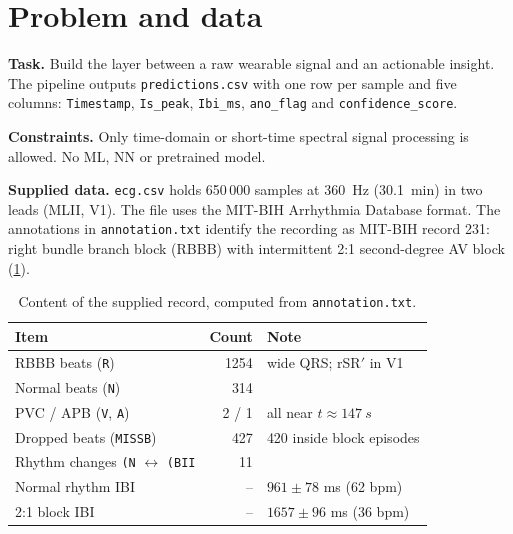 \documentclass[10pt,a4paper]{article}
\newcommand{\code}[1]{\texttt{#1}}
\begin{document}
\begin{abstract}
\textbf{Results.}
\begin{itemize}
  \item Supplied record (MIT-BIH 231, intermittent 2:1 AV block): beat $F_1=1.000$, IBI mean absolute error
        \SI{0.99}{ms}, sample-level anomaly $F_1=0.992$.
  \item 44 stress sets (real NSTDB noise, seven real AF/VT records, synthetic motion-corrupted PPG): mean beat
        $F_1=0.925$, mean anomaly $F_1=0.878$. The two design branches alone scored 0.925 / 0.860 and 0.892 / 0.774.
  \item Independent PPG fixture with accelerometer, jittered timestamps and gaps: beat $F_1=0.996$, anomaly $F_1=0.865$.
  \item Runtime: about \SI{2}{s} per \SI{30}{min} record, end to end.
\end{itemize}
\end{abstract}

\section{Problem and data}

\textbf{Task.} Build the layer between a raw wearable signal and an actionable insight. The pipeline outputs
\code{predictions.csv} with one row per sample and five columns:
\code{Timestamp}, \code{Is\_peak}, \code{Ibi\_ms}, \code{ano\_flag} and \code{confidence\_score}.

\textbf{Constraints.} Only time-domain or short-time spectral signal processing is allowed. No ML, NN or pretrained model.

\textbf{Supplied data.} \code{ecg.csv} holds 650\,000 samples at \SI{360}{Hz} (\SI{30.1}{min}) in two leads (MLII, V1).
The file uses the MIT-BIH Arrhythmia Database format. The annotations in \code{annotation.txt} identify the recording as
MIT-BIH record 231: right bundle branch block (RBBB) with intermittent 2:1 second-degree AV block
(\cref{tab:data}).

\begin{table}[h]
\centering\small
\caption{Content of the supplied record, computed from \code{annotation.txt}.}
\label{tab:data}
\begin{tabular}{lrl}
\toprule
Item & Count & Note\\
\midrule
RBBB beats (\code{R}) & 1254 & wide QRS; rSR$'$ in V1\\
Normal beats (\code{N}) & 314 & \\
PVC / APB (\code{V}, \code{A}) & 2 / 1 & all near $t\approx\SI{147}{s}$\\
Dropped beats (\code{MISSB}) & 427 & 420 inside block episodes\\
Rhythm changes \code{(N} $\leftrightarrow$ \code{(BII} & 11 & \\
\midrule
Normal rhythm IBI & -- & $961\pm78$ ms (62 bpm)\\
2:1 block IBI & -- & $1657\pm96$ ms (36 bpm)\\
\bottomrule
\end{tabular}
\end{table}
\end{document}
